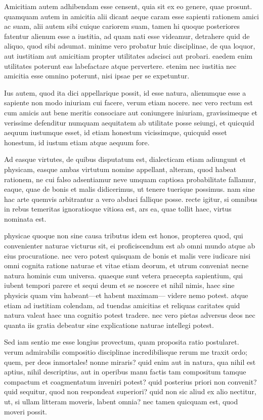  Amicitiam autem adhibendam esse censent, quia sit ex eo genere, quae prosunt. quamquam autem in amicitia alii dicant aeque caram esse sapienti rationem amici ac suam, alii autem sibi cuique cariorem suam, tamen hi quoque posteriores fatentur alienum esse a iustitia, ad quam nati esse videamur, detrahere quid de aliquo, quod sibi adsumat. minime vero probatur huic disciplinae, de qua loquor, aut iustitiam aut amicitiam propter utilitates adscisci aut probari. eaedem enim utilitates poterunt eas labefactare atque pervertere. etenim nec iustitia nec amicitia esse omnino poterunt, nisi ipsae per se expetuntur.

 Ius autem, quod ita dici appellarique possit, id esse natura, alienumque esse a sapiente non modo iniuriam cui facere, verum etiam nocere. nec vero rectum est cum amicis aut bene meritis consociare aut coniungere iniuriam, gravissimeque et verissime defenditur numquam aequitatem ab utilitate posse seiungi, et quicquid aequum iustumque esset, id etiam honestum vicissimque, quicquid esset honestum, id iustum etiam atque aequum fore.

 Ad easque virtutes, de quibus disputatum est, dialecticam etiam adiungunt et physicam, easque ambas virtutum nomine appellant, alteram, quod habeat rationem, ne cui falso adsentiamur neve umquam captiosa probabilitate fallamur, eaque, quae de bonis et malis didicerimus, ut tenere tuerique possimus. nam sine hac arte quemvis arbitrantur a vero abduci fallique posse. recte igitur, si omnibus in rebus temeritas ignoratioque vitiosa est, ars ea, quae tollit haec, virtus nominata est.

 physicae quoque non sine causa tributus idem est honos, propterea quod, qui convenienter naturae victurus sit, ei proficiscendum est ab omni mundo atque ab eius procuratione. nec vero potest quisquam de bonis et malis vere iudicare nisi omni cognita ratione naturae et vitae etiam deorum, et utrum conveniat necne natura hominis cum universa. quaeque sunt vetera praecepta sapientium, qui iubent tempori parere et sequi deum et se noscere et nihil nimis, haec sine physicis quam vim habeant—et habent maximam— videre nemo potest. atque etiam ad iustitiam colendam, ad tuendas amicitias et reliquas caritates quid natura valeat haec una cognitio potest tradere. nec vero pietas adversus deos nec quanta iis gratia debeatur sine explicatione naturae intellegi potest.

 Sed iam sentio me esse longius provectum, quam proposita ratio postularet. verum admirabilis compositio disciplinae incredibilisque rerum me traxit ordo; quem, per deos inmortales! nonne miraris? quid enim aut in natura, qua nihil est aptius, nihil descriptius, aut in operibus manu factis tam compositum tamque compactum et coagmentatum inveniri potest? quid posterius priori non convenit? quid sequitur, quod non respondeat superiori? quid non sic aliud ex alio nectitur, ut, si ullam litteram moveris, labent omnia? nec tamen quicquam est, quod moveri possit.

